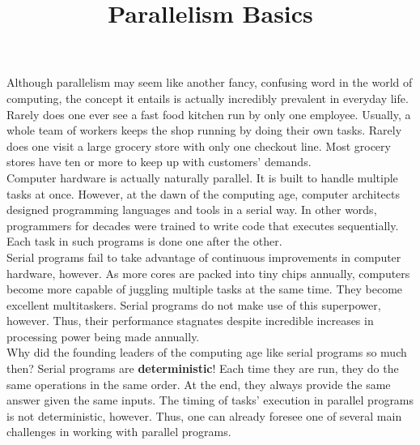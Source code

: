 \documentclass{article}
\title{Parallelism Basics}
\author{}
\date{}
\begin{document}
\maketitle

    Although parallelism may seem like another fancy, confusing word in the world of computing, the concept it entails is actually incredibly prevalent in everyday life. Rarely does one ever see a fast food kitchen run by only one employee. Usually, a whole team of workers keeps the shop running by doing their own tasks. Rarely does one visit a large grocery store with only one checkout line. Most grocery stores have ten or more to keep up with customers' demands. \\

    Computer hardware is actually naturally parallel. It is built to handle multiple tasks at once. However, at the dawn of the computing age, computer architects designed programming languages and tools in a serial way. In other words, programmers for decades were trained to write code that executes sequentially. Each task in such programs is done one after the other. \\

    Serial programs fail to take advantage of continuous improvements in computer hardware, however. As more cores are packed into tiny chips annually, computers become more capable of juggling multiple tasks at the same time. They become excellent multitaskers. Serial programs do not make use of this superpower, however. Thus, their performance stagnates despite incredible increases in processing power being made annually. \\
    
    Why did the founding leaders of the computing age like serial programs so much then? Serial programs are \textbf{deterministic}! Each time they are run, they do the same operations in the same order. At the end, they always provide the same answer given the same inputs. The timing of tasks' execution in parallel programs is not deterministic, however. Thus, one can already foresee one of several main challenges in working with parallel programs. \\
\end{document}
